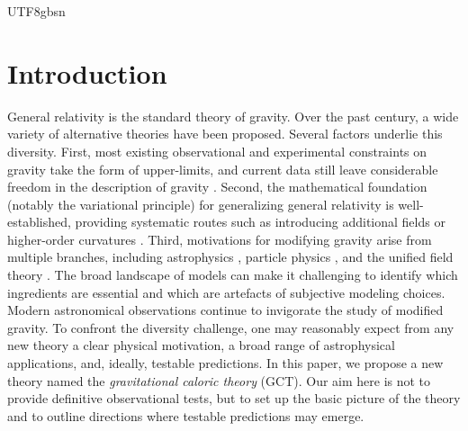 \documentclass[aps,prd,twocolumn]{revtex4-2}
\begin{document}
\begin{CJK*}{UTF8}{gbsn}
\begin{abstract}
\end{abstract}
\makeatletter
\begingroup
  \let\Hy@writebookmark\@hidebookmark
  \maketitle
\endgroup
\makeatother
\end{CJK*}
\tableofcontents


\section{Introduction}\label{sec:I}
General relativity \cite{Einstein1916.NotEngJ.354.769} is the standard theory of gravity. Over the past century, a wide variety of alternative theories have been proposed. Several factors underlie this diversity. First, most existing observational and experimental constraints on gravity take the form of upper-limits, and current data still leave considerable freedom in the description of gravity \cite{Fischbach1999.book,Will2014.LRR.17.4}. Second, the mathematical foundation (notably the variational principle) for generalizing general relativity is well-established, providing systematic routes such as introducing additional fields \cite{Brans1961.PhysRev.124.925} or higher-order curvatures \cite{Buchdahl1970.MNRAS.150.1}. Third, motivations for modifying gravity arise from multiple branches, including astrophysics \cite{Starobinsky1980.PLB.91.99,Milgrom1983.ApJ.270.365,Carroll2004.PRD.70.043528}, particle physics \cite{Lee1955.PhysRev.98.1501,ArkaniHamed1998.PLB.429.263}, and the unified field theory \cite{Green1984.PLB.149.117}. The broad landscape of models can make it challenging to identify which ingredients are essential and which are artefacts of subjective modeling choices. Modern astronomical observations continue to invigorate the study of modified gravity. To confront the diversity challenge, one may reasonably expect from any new theory a clear physical motivation, a broad range of astrophysical applications, and, ideally, testable predictions. In this paper, we propose a new theory named the \textit{gravitational caloric theory} (GCT). Our aim here is not to provide definitive observational tests, but to set up the basic picture of the theory and to outline directions where testable predictions may emerge.
\end{document}
